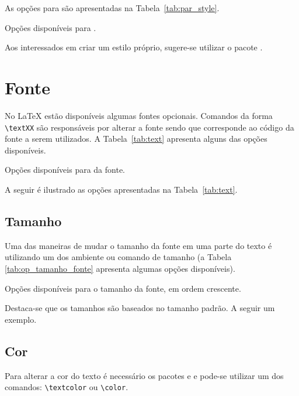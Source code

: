 As opções para  são apresentadas na Tabela~\ref{tab:par_style}.
\begin{table}[!htb]
    \centering
    \caption{Opções disponíveis para .}
    \label{tab:par_style}
    
\end{table}

Aos interessados em criar um estilo próprio, sugere-se utilizar o pacote .
\section{Fonte}
No LaTeX estão disponíveis algumas fontes opcionais. Comandos da forma \lstinline!\textXX! são responsáveis por alterar a fonte sendo que  corresponde ao código da fonte a serem utilizados. A Tabela~\ref{tab:text} apresenta alguns das opções disponíveis.
\begin{table}[!htb]
    \centering
    \caption{Opções disponíveis para  da fonte.} \label{tab:text}
    
\end{table}

A seguir é ilustrado as opções apresentadas na Tabela~\ref{tab:text}. \\

\subsection{Tamanho}
Uma das maneiras de mudar o tamanho da fonte em uma parte do texto é utilizando um dos ambiente  ou comando de tamanho (a Tabela \ref{tab:op_tamanho_fonte} apresenta algumas opções disponíveis).
\begin{table}[h!tb]
    \centering
    \caption{Opções disponíveis para o tamanho da fonte, em ordem crescente.}
    \label{tab:op_tamanho_fonte}
    
\end{table}

Destaca-se que os tamanhos são baseados no tamanho padrão. A seguir um exemplo. \\

\subsection{Cor}
Para alterar a cor do texto é necessário os pacotes  e  e pode-se utilizar um dos comandos: \lstinline!\textcolor! ou \lstinline!\color!.

